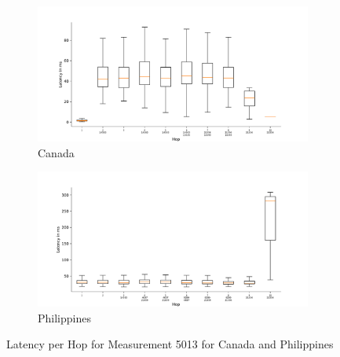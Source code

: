\begin{figure}
	\centering
	\begin{subfigure}[b]{\linewidth}
		\includegraphics[width=\linewidth]{chapters/4-results/traceroute/img/latency-per-hop-CA-5013.pdf}
		\caption{Canada}
	\end{subfigure}
	\begin{subfigure}[b]{\linewidth}
		\includegraphics[width=\linewidth]{chapters/4-results/traceroute/img/latency-per-hop-PH-5013.pdf}
		\caption{Philippines}
	\end{subfigure}
	\caption{Latency per Hop for Measurement 5013 for Canada and
		Philippines}
	\label{fig:latency-change-per-hop-appendix-13}
\end{figure}

